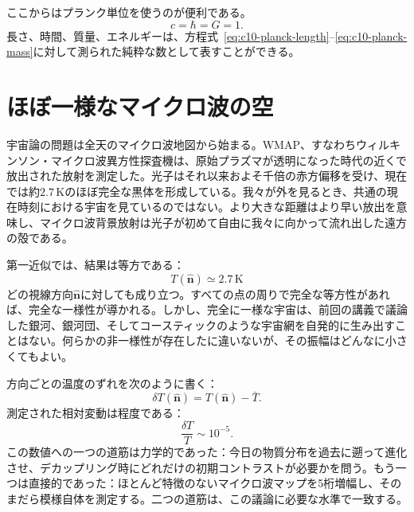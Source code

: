 ここからはプランク単位を使うのが便利である。
\begin{equation}
c=\hbar=G=1.
\label{eq:c10-planck-units}
\end{equation}
長さ、時間、質量、エネルギーは、方程式~\eqref{eq:c10-planck-length}--\eqref{eq:c10-planck-mass}に対して測られた純粋な数として表すことができる。

\section{ほぼ一様なマイクロ波の空}

宇宙論の問題は全天のマイクロ波地図から始まる。WMAP、すなわちウィルキンソン・マイクロ波異方性探査機は、原始プラズマが透明になった時代の近くで放出された放射を測定した。光子はそれ以来およそ千倍の赤方偏移を受け、現在では約\(2.7\,\mathrm K\)のほぼ完全な黒体を形成している。我々が外を見るとき、共通の現在時刻における宇宙を見ているのではない。より大きな距離はより早い放出を意味し、マイクロ波背景放射は光子が初めて自由に我々に向かって流れ出した遠方の殻である。

\begin{classroomqa}
\end{classroomqa}

第一近似では、結果は等方である：
\[
T(\hat{\mathbf n})\simeq 2.7\,\mathrm K
\]
どの視線方向\(\hat{\mathbf n}\)に対しても成り立つ。すべての点の周りで完全な等方性があれば、完全な一様性が導かれる。しかし、完全に一様な宇宙は、前回の講義で議論した銀河、銀河団、そしてコースティックのような宇宙網を自発的に生み出すことはない。何らかの非一様性が存在したに違いないが、その振幅はどんなに小さくてもよい。

方向ごとの温度のずれを次のように書く：
\[
\delta T(\hat{\mathbf n})=T(\hat{\mathbf n})-\bar T.
\]
測定された相対変動は程度である：
\begin{equation}
\frac{\delta T}{T}\sim10^{-5}.
\label{eq:c10-cmb-anisotropy}
\end{equation}
この数値への一つの道筋は力学的であった：今日の物質分布を過去に遡って進化させ、デカップリング時にどれだけの初期コントラストが必要かを問う。もう一つは直接的であった：ほとんど特徴のないマイクロ波マップを5桁増幅し、そのまだら模様自体を測定する。二つの道筋は、この議論に必要な水準で一致する。

